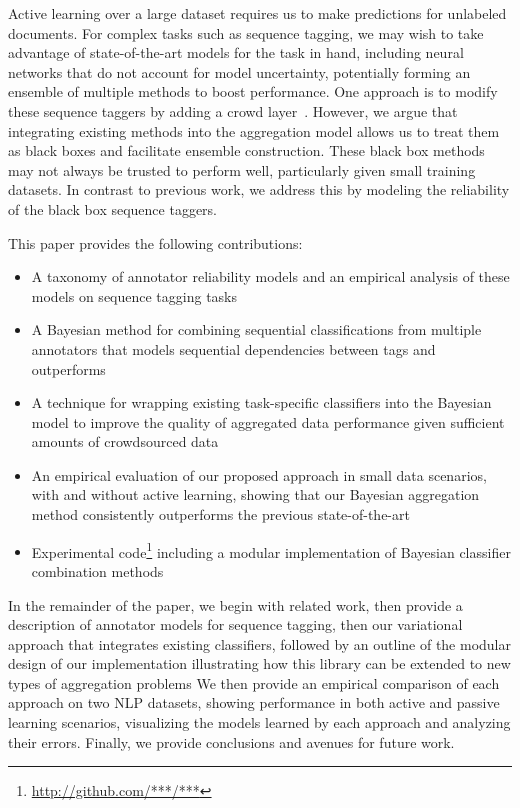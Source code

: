 Active learning over a large dataset requires us to make predictions for unlabeled documents.
For complex tasks such as sequence tagging, 
we may wish to take advantage of state-of-the-art models for the task in hand, including neural networks
that do not account for model uncertainty, 
potentially forming an ensemble of multiple methods to boost performance.
One approach is to modify these sequence taggers by adding a crowd layer~\cite{nguyen2017aggregating,rodrigues2018deep}. 
However, we argue that integrating existing methods into the aggregation model allows us to
treat them as black boxes and facilitate ensemble construction.
These black box methods may not always be trusted to perform well, particularly given small training datasets.
In contrast to previous work, we address this by modeling the reliability of the black box 
sequence taggers.

This paper provides the following contributions:
\begin{itemize}
 \item A taxonomy of annotator reliability models and an empirical analysis of these models on sequence tagging tasks
  \item A Bayesian method for combining sequential classifications from multiple annotators that models sequential dependencies between tags and outperforms 
 \item A technique for wrapping existing task-specific classifiers into the Bayesian model to improve 
 the quality of aggregated data performance given sufficient amounts of crowdsourced data
 \item An empirical evaluation of our proposed approach in small data scenarios, with and without active learning,
 showing that our Bayesian aggregation method consistently outperforms the previous state-of-the-art
 \item Experimental code\footnote{\url{http://github.com/***/***}} including a modular implementation of Bayesian classifier combination methods 
\end{itemize}
In the remainder of the paper, we begin with related work, 
then provide a description of annotator models for sequence tagging,
then our variational approach that integrates existing classifiers,
followed by an outline of the modular design of our implementation 
illustrating how this library can be extended to new types of aggregation problems
We then provide an empirical comparison of each approach on two NLP datasets,
showing performance in both active and passive learning scenarios, 
visualizing the models learned by each approach and analyzing their errors.
Finally, we provide conclusions and avenues for future work.

